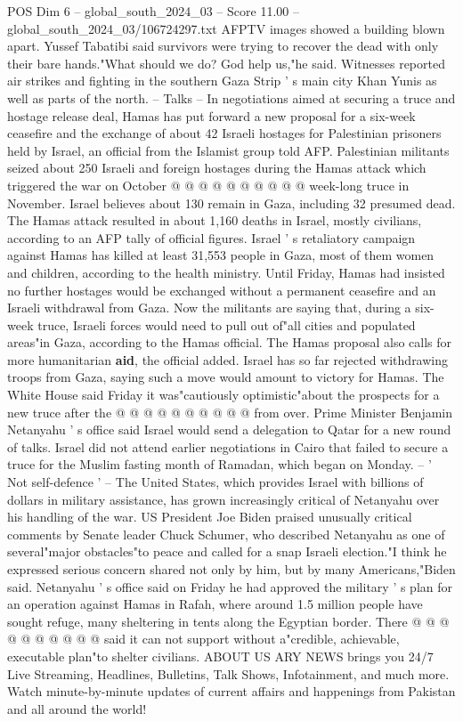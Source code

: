 \begin{textsample}{POS Dim 6 – global\_south\_2024\_03 – Score 11.00 – global\_south\_2024\_03/106724297.txt}
AFPTV images showed a building blown apart.
Yussef Tabatibi said survivors were trying to recover the dead with only their bare hands."What should we do?
God help us,"he said.
Witnesses reported air strikes and fighting in the southern Gaza Strip ' s main city Khan Yunis as well as parts of the north. -- Talks -- In negotiations aimed at securing a truce and hostage release deal, Hamas has put forward a new proposal for a six-week ceasefire and the exchange of about 42 Israeli hostages for Palestinian prisoners held by Israel, an official from the Islamist group told AFP.
Palestinian militants seized about 250 Israeli and foreign hostages during the Hamas attack which triggered the war on October @ @ @ @ @ @ @ @ @ @ week-long truce in November.
Israel believes about 130 remain in Gaza, including 32 presumed dead.
The Hamas attack resulted in about 1,160 deaths in Israel, mostly civilians, according to an AFP tally of official figures.
Israel ' s retaliatory campaign against Hamas has killed at least 31,553 people in Gaza, most of them women and children, according to the health ministry.
Until Friday, Hamas had insisted no further hostages would be exchanged without a permanent ceasefire and an Israeli withdrawal from Gaza.
Now the militants are saying that, during a six-week truce, Israeli forces would need to pull out of"all cities and populated areas"in Gaza, according to the Hamas official.
The Hamas proposal also calls for more humanitarian \textbf{aid}, the official added.
Israel has so far rejected withdrawing troops from Gaza, saying such a move would amount to victory for Hamas.
The White House said Friday it was"cautiously optimistic"about the prospects for a new truce after the @ @ @ @ @ @ @ @ @ @ from over.
Prime Minister Benjamin Netanyahu ' s office said Israel would send a delegation to Qatar for a new round of talks.
Israel did not attend earlier negotiations in Cairo that failed to secure a truce for the Muslim fasting month of Ramadan, which began on Monday. -- ' Not self-defence ' -- The United States, which provides Israel with billions of dollars in military assistance, has grown increasingly critical of Netanyahu over his handling of the war.
US President Joe Biden praised unusually critical comments by Senate leader Chuck Schumer, who described Netanyahu as one of several"major obstacles"to peace and called for a snap Israeli election."I think he expressed serious concern shared not only by him, but by many Americans,"Biden said.
Netanyahu ' s office said on Friday he had approved the military ' s plan for an operation against Hamas in Rafah, where around 1.5 million people have sought refuge, many sheltering in tents along the Egyptian border.
There @ @ @ @ @ @ @ @ @ @ said it can not support without a"credible, achievable, executable plan"to shelter civilians.
ABOUT US ARY NEWS brings you 24/7 Live Streaming, Headlines, Bulletins, Talk Shows, Infotainment, and much more.
Watch minute-by-minute updates of current affairs and happenings from Pakistan and all around the world!

\end{textsample}
